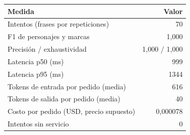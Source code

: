 \begin{tabular}{@{}lr@{}}\toprule
Medida & Valor\\\midrule
Intentos (frases por repeticiones) & 70\\
F1 de personajes y marcas & 1,000\\
Precisión / exhaustividad & 1,000 / 1,000\\
Latencia p50 (ms) & 999\\
Latencia p95 (ms) & 1344\\
Tokens de entrada por pedido (media) & 616\\
Tokens de salida por pedido (media) & 40\\
Costo por pedido (USD, precio supuesto) & 0,000078\\
Intentos sin servicio & 0\\
\bottomrule\end{tabular}
